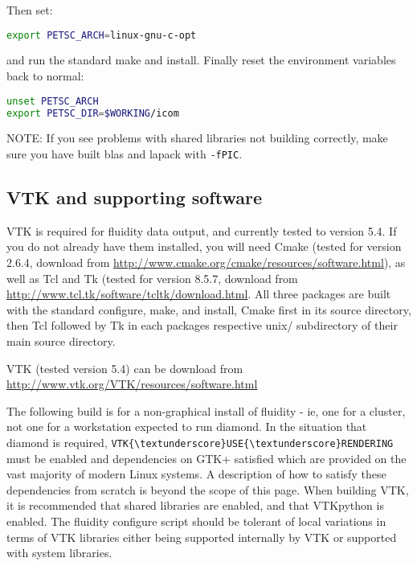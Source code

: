 Then set:

\begin{lstlisting}[language=bash]
export PETSC_ARCH=linux-gnu-c-opt
\end{lstlisting}

and run the standard make and install. Finally reset the environment variables
back to normal:

\begin{lstlisting}[language=bash]
unset PETSC_ARCH
export PETSC_DIR=$WORKING/icom
\end{lstlisting}

NOTE: If you see problems with shared libraries not building correctly, make
sure you have built blas and lapack with \lstinline[language=bash]+-fPIC+.

\subsection{VTK and supporting software}
\label{sect:required_libraries_vtk}

VTK is required for fluidity data output, and currently tested to version 5.4.
If you do not already have them installed, you will need Cmake (tested for
version 2.6.4, download from
\url{http://www.cmake.org/cmake/resources/software.html}), as well as Tcl and
Tk (tested for version 8.5.7, download from
\url{http://www.tcl.tk/software/tcltk/download.html}. All three packages are
built with the standard configure, make, and install, Cmake first in its source
directory, then Tcl followed by Tk in each packages respective unix/
subdirectory of their main source directory.

VTK (tested version 5.4) can be download from
\url{http://www.vtk.org/VTK/resources/software.html}

The following build is for a non-graphical install of fluidity - ie, one for a
cluster, not one for a workstation expected to run diamond. In the situation
that diamond is required,
\lstinline[language=bash]+VTK{\textunderscore}USE{\textunderscore}RENDERING+
must be enabled and dependencies on GTK+ satisfied which are provided on the
vast majority of modern Linux systems. A description of how to satisfy these
dependencies from scratch is beyond the scope of this page.  When building VTK,
it is recommended that shared libraries are enabled, and that VTKpython is
enabled. The fluidity configure script should be tolerant of local variations
in terms of VTK libraries either being supported internally by VTK or supported
with system libraries.

